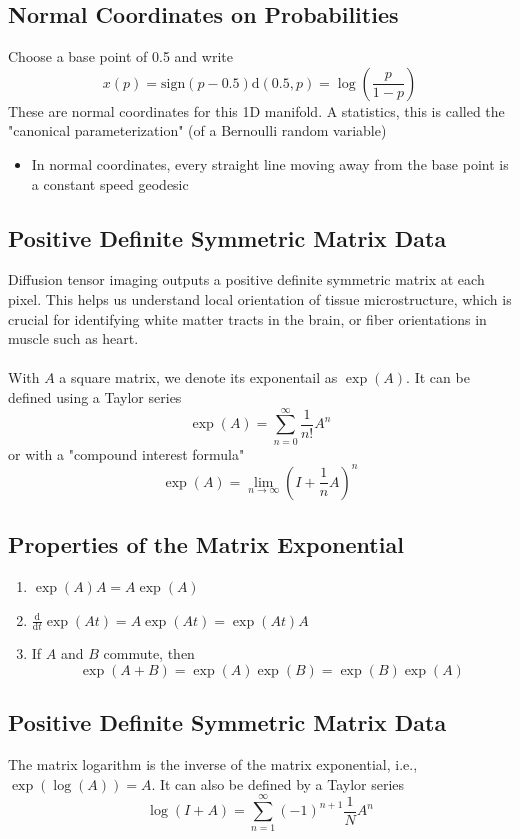 \documentclass[10pt]{article}
\newcommand{\dd}{\text{d}}
\begin{document}
\subsection*{Normal Coordinates on Probabilities}
Choose a base point of 0.5 and write
\[x(p) = \text{sign}(p - 0.5)\dd (0.5, p) = \log\left(\frac{p}{1 - p}\right)\]
These are normal coordinates for this 1D manifold.  A statistics, this is called the "canonical parameterization" (of a Bernoulli random variable)
\begin{itemize}
	\item In normal coordinates, every straight line moving away from the base point is a constant speed geodesic
\end{itemize}

\subsection*{Positive Definite Symmetric Matrix Data}
Diffusion tensor imaging outputs a positive definite symmetric matrix at each pixel.  This helps us understand local orientation of tissue microstructure, which is crucial for identifying white matter tracts in the brain, or fiber orientations in muscle such as heart.\\\\
With $A$ a square matrix, we denote its exponentail as $\exp(A)$.  It can be defined using a Taylor series
\[\exp(A) = \sum_{n = 0}^\infty \frac{1}{n!} A^n\]
or with a "compound interest formula"
\[\exp(A) = \lim_{n \rightarrow \infty} \left(I + \frac{1}{n}A\right)^n\]

\subsection*{Properties of the Matrix Exponential}
\begin{enumerate}
    \item $\exp(A)A = A \exp(A)$
    \item $\frac{\dd}{\dd t} \exp(At) = A \exp(At) = \exp(At)A$
    \item If $A$ and $B$ commute, then 
    \[\exp(A + B) = \exp(A)\exp(B) = \exp(B)\exp(A)\]
\end{enumerate}

\subsection*{Positive Definite Symmetric Matrix Data}
The matrix logarithm is the inverse of the matrix exponential, i.e., $\exp(\log(A)) = A$.  It can also be defined by a Taylor series
\[\log(I + A) = \sum_{n = 1}^\infty (-1)^{n + 1} \frac{1}{N} A^n\]
\end{document}
